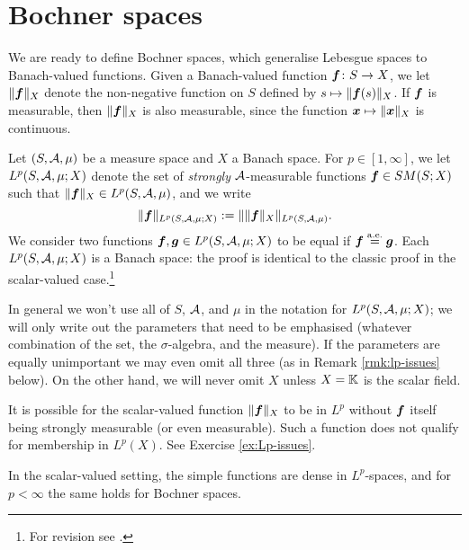 \section{Bochner spaces}

We are ready to define Bochner spaces, which generalise Lebesgue spaces to Banach-valued functions.
Given a Banach-valued function $\bm{f} \colon S \rightarrow X$, we let $\|\bm{f}\|_X$ denote the non-negative function on $S$ defined by $s \mapsto \|\bm{f}(s)\|_X$.
If $\bm{f}$ is measurable, then $\|\bm{f}\|_X$ is also measurable, since the function $\bm{x} \mapsto \|\bm{x}\|_X$ is continuous.

\begin{defn}
  Let $(S,\mathcal{A},\mu)$ be a measure space and $X$ a Banach space.
  For $p \in [1,\infty]$, we let $L^p(S,\mathcal{A},\mu;X)$ denote the set of \emph{strongly} $\mathcal{A}$-measurable functions $\bm{f} \in SM(S;X)$ such that $\|\bm{f}\|_X \in L^p(S,\mathcal{A},\mu)$, and we write
  \begin{equation*}
    \|\bm{f}\|_{L^p(S,\mathcal{A},\mu;X)} := \| \|\bm{f}\|_X \|_{L^p(S,\mathcal{A},\mu)}.
  \end{equation*}
  We consider two functions $\bm{f}, \bm{g} \in L^p(S,\mathcal{A},\mu;X)$ to be equal if $\bm{f} \stackrel{\mathrm{a.e.}}{=} \bm{g}$.
  Each $L^p(S,\mathcal{A},\mu;X)$ is a Banach space: the proof is identical to the classic proof in the scalar-valued case.\footnote{For revision see \cite[Theorem 5.2.1]{rD04}.}
\end{defn}

In general we won't use all of $S$, $\mathcal{A}$, and $\mu$ in the notation for $L^p(S,\mathcal{A},\mu;X)$; we will only write out the parameters that need to be emphasised (whatever combination of the set, the $\sigma$-algebra, and the measure).
If the parameters are equally unimportant we may even omit all three (as in Remark \ref{rmk:lp-issues} below).
On the other hand, we will never omit $X$ unless $X = \mathbb{K}$ is the scalar field.

\begin{rmk}\label{rmk:lp-issues}
  It is possible for the scalar-valued function $\|\bm{f}\|_X$ to be in $L^p$ without $\bm{f}$ itself being strongly measurable (or even measurable).
  Such a function does not qualify for membership in $L^p(X)$.
  See Exercise \ref{ex:Lp-issues}.
\end{rmk}

In the scalar-valued setting, the simple functions are dense in $L^p$-spaces, and for $p < \infty$ the same holds for Bochner spaces. 

